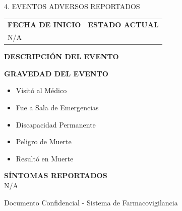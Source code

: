 \documentclass[10pt, a4paper]{article}
\begin{document}
\vspace{15pt}

\begin{sectionbox}{4. EVENTOS ADVERSOS REPORTADOS}
\end{sectionbox}

\vspace{10pt}
\begin{tabularx}{\textwidth}{X X}
    \footnotesize\textbf{\textcolor{textgray}{FECHA DE INICIO}} & \footnotesize\textbf{\textcolor{textgray}{ESTADO ACTUAL}} \\
    \footnotesize N/A & \\
\end{tabularx}

\vspace{10pt}
\footnotesize\textbf{\textcolor{textgray}{DESCRIPCIÓN DEL EVENTO}} \\
\begin{tcolorbox}[colback=lightgray, colframe=lightgray, height=1.5cm, sharp corners]
\end{tcolorbox}

\vspace{10pt}
\footnotesize\textbf{\textcolor{textgray}{GRAVEDAD DEL EVENTO}} \\
\begin{itemize}
    \item[\Square] \footnotesize Visitó al Médico
    \item[\Square] \footnotesize Fue a Sala de Emergencias
    \item[\Square] \footnotesize Discapacidad Permanente
    \item[\Square] \footnotesize Peligro de Muerte
    \item[\Square] \footnotesize Resultó en Muerte
\end{itemize}

\footnotesize\textbf{\textcolor{textgray}{SÍNTOMAS REPORTADOS}} \\
\footnotesize N/A

\vfill
\begin{center}
    \scriptsize\textcolor{textgray}{Documento Confidencial - Sistema de Farmacovigilancia}
\end{center}
\end{document}

